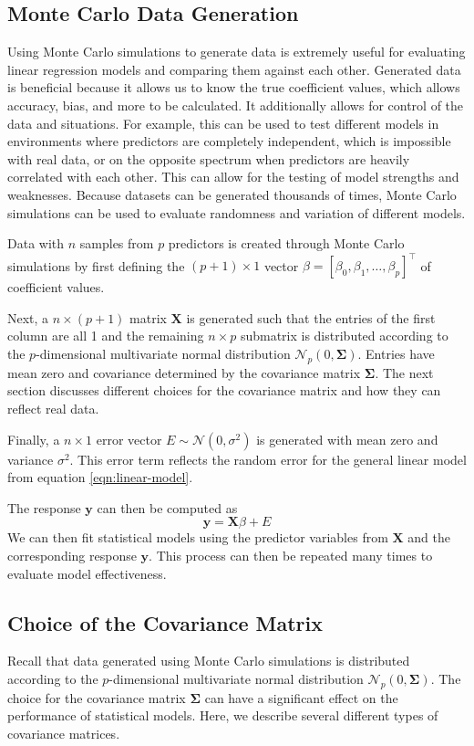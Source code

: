 \documentclass{article}
\begin{document}
\subsection{Monte Carlo Data Generation}
Using Monte Carlo simulations to generate data is extremely useful for evaluating linear regression models and comparing them against each other. Generated data is beneficial because it allows us to know the true coefficient values, which allows accuracy, bias, and more to be calculated. It additionally allows for control of the data and situations. For example, this can be used to test different models in environments where predictors are completely independent, which is impossible with real data, or on the opposite spectrum when predictors are heavily correlated with each other. This can allow for the testing of model strengths and weaknesses. Because datasets can be generated thousands of times, Monte Carlo simulations can be used to evaluate randomness and variation of different models.

Data with $n$ samples from $p$ predictors is created through Monte Carlo simulations by first defining the $(p + 1)\times 1$ vector $\beta = [\beta_0, \beta_1, \dotsc, \beta_p]^\top$ of coefficient values.

Next, a $n\times(p + 1)$ matrix $\mathbf{X}$ is generated such that the entries of the first column are all 1 and the remaining $n\times p$ submatrix is distributed according to the $p$-dimensional multivariate normal distribution $\mathcal{N}_p(0, \mathbf{\Sigma})$. Entries have mean zero and covariance determined by the covariance matrix $\mathbf{\Sigma}$. The next section discusses different choices for the covariance matrix and how they can reflect real data.

Finally, a $n\times 1$ error vector $E\sim \mathcal{N}(0, \sigma^2)$ is generated with mean zero and variance $\sigma^2$. This error term reflects the random error for the general linear model from equation \ref{eqn:linear-model}.

The response $\mathbf{y}$ can then be computed as
\begin{equation}
	\mathbf{y}=\mathbf{X}\beta + E
\end{equation}
We can then fit statistical models using the predictor variables from $\mathbf{X}$ and the corresponding response $\mathbf{y}$. This process can then be repeated many times to evaluate model effectiveness.

\subsection{Choice of the Covariance Matrix}
Recall that data generated using Monte Carlo simulations is distributed according to the $p$-dimensional multivariate normal distribution $\mathcal{N}_p(0, \mathbf{\Sigma})$. The choice for the covariance matrix $\mathbf{\Sigma}$ can have a significant effect on the performance of statistical models. Here, we describe several different types of covariance matrices.
\end{document}
